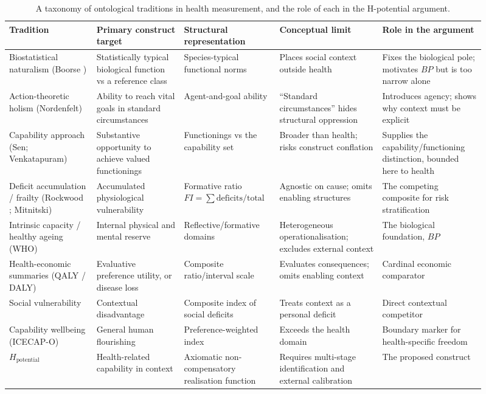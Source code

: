 \begin{table}[htbp]
\centering
\caption{A taxonomy of ontological traditions in health measurement, and the role of each in the H-potential argument.}
\label{tab:taxonomy}
\footnotesize
\renewcommand{\arraystretch}{1.15}
\begin{tabular}{p{0.17\linewidth} p{0.17\linewidth} p{0.17\linewidth} p{0.20\linewidth} p{0.20\linewidth}}
\toprule
\textbf{Tradition} & \textbf{Primary construct target} & \textbf{Structural representation} & \textbf{Conceptual limit} & \textbf{Role in the argument} \\
\midrule
Biostatistical naturalism (Boorse \citep{boorse_1977}) & Statistically typical biological function vs a reference class & Species-typical functional norms & Places social context outside health & Fixes the biological pole; motivates $BP$ but is too narrow alone \\
\addlinespace
Action-theoretic holism (Nordenfelt) & Ability to reach vital goals in standard circumstances & Agent-and-goal ability & ``Standard circumstances'' hides structural oppression & Introduces agency; shows why context must be explicit \\
\addlinespace
Capability approach (Sen; Venkatapuram) & Substantive opportunity to achieve valued functionings & Functionings vs the capability set & Broader than health; risks construct conflation & Supplies the capability/functioning distinction, bounded here to health \\
\addlinespace
Deficit accumulation / frailty (Rockwood \citep{rockwood_mitnitski_2007,searle_2008}; Mitnitski) & Accumulated physiological vulnerability & Formative ratio $FI=\sum\text{deficits}/\text{total}$ & Agnostic on cause; omits enabling structures & The competing composite for risk stratification \\
\addlinespace
Intrinsic capacity / healthy ageing (WHO) & Internal physical and mental reserve & Reflective/formative domains & Heterogeneous operationalisation; excludes external context & The biological foundation, $BP$ \\
\midrule
Health-economic summaries (QALY / DALY) & Evaluative preference utility, or disease loss & Composite ratio/interval scale & Evaluates consequences; omits enabling context & Cardinal economic comparator \\
\addlinespace
Social vulnerability & Contextual disadvantage & Composite index of social deficits & Treats context as a personal deficit & Direct contextual competitor \\
\addlinespace
Capability wellbeing (ICECAP-O) \citep{icecap_o,coast_2008} & General human flourishing & Preference-weighted index & Exceeds the health domain & Boundary marker for health-specific freedom \\
\midrule
\textbf{$H_{\text{potential}}$} & Health-related capability in context & Axiomatic non-compensatory realisation function & Requires multi-stage identification and external calibration & The proposed construct \\
\bottomrule
\end{tabular}
\end{table}

